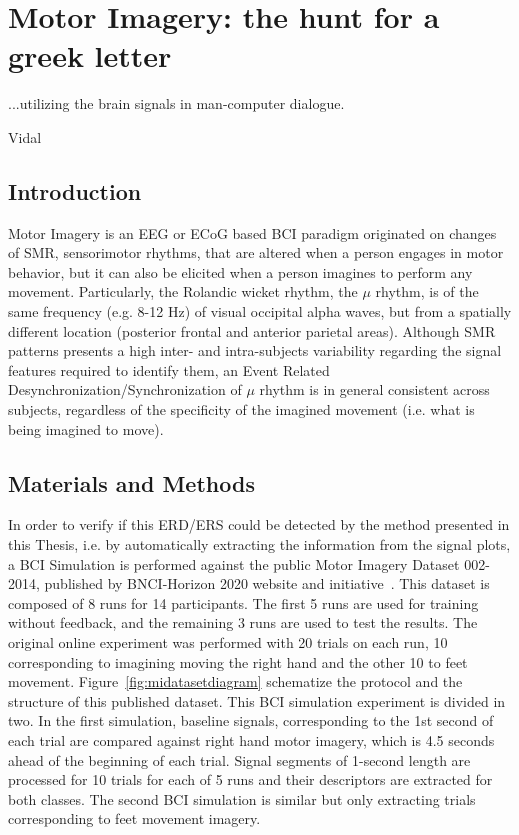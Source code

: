 \chapter{Motor Imagery: the hunt for a greek letter}
\label{chapter:five}
\epigraph{...utilizing the brain signals in man-computer dialogue.}{Vidal}

\section{Introduction}

Motor Imagery is an EEG or ECoG based BCI paradigm originated on changes of SMR, sensorimotor rhythms, that are altered when a person engages in motor behavior, but it can also be elicited when a person imagines to perform any movement. Particularly, the Rolandic wicket rhythm, the $\mu$ rhythm, is of the same frequency (e.g. 8-12 Hz) of visual occipital alpha waves, but from a spatially different location (posterior frontal and anterior parietal areas)\cite{WolpawJonathanR2012}.   Although SMR patterns presents a high inter- and intra-subjects variability regarding the signal features required to identify them, an Event Related Desynchronization/Synchronization of $\mu$ rhythm is in general consistent across subjects, regardless of the specificity of the imagined movement (i.e. what is being imagined to move).

\section{Materials and Methods}

In order to verify if this ERD/ERS could be detected by the method presented in this Thesis, i.e. by automatically extracting the information from the signal plots, a BCI Simulation is performed against the public Motor Imagery Dataset 002-2014, published by BNCI-Horizon 2020 website and initiative~\cite{Steyrl2015}.  This dataset is composed of 8 runs for 14 participants.  The first 5 runs are used for training without feedback, and the remaining 3 runs are used to test the results.  The original online experiment was performed with 20 trials on each run, 10 corresponding to imagining moving the right hand and the other 10 to feet movement.  Figure~\ref{fig:midatasetdiagram} schematize the protocol and the structure of this published dataset.  This BCI simulation experiment is divided in two.  In the first simulation, baseline signals, corresponding to the 1st second of each trial are compared against right hand motor imagery, which is 4.5 seconds ahead of the beginning of each trial. Signal segments of 1-second length are processed for 10 trials for each of 5 runs and their descriptors are extracted for both classes.  The second BCI simulation is similar but only extracting trials corresponding to feet movement imagery.

